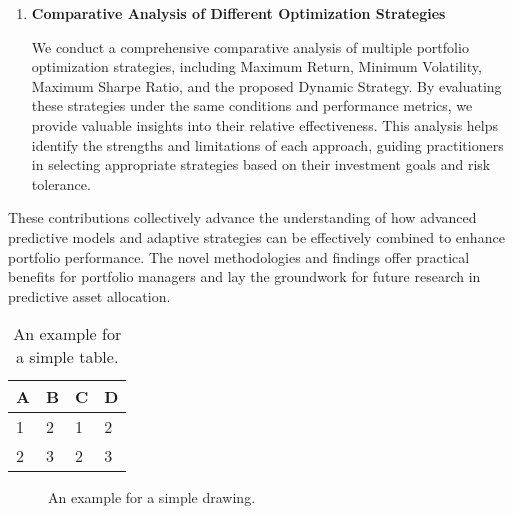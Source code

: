 \begin{enumerate}
    \item \textbf{Comparative Analysis of Different Optimization Strategies}

    We conduct a comprehensive comparative analysis of multiple portfolio optimization strategies, including Maximum Return, Minimum Volatility, Maximum Sharpe Ratio, and the proposed Dynamic Strategy. By evaluating these strategies under the same conditions and performance metrics, we provide valuable insights into their relative effectiveness. This analysis helps identify the strengths and limitations of each approach, guiding practitioners in selecting appropriate strategies based on their investment goals and risk tolerance.

\end{enumerate}

These contributions collectively advance the understanding of how advanced predictive models and adaptive strategies can be effectively combined to enhance portfolio performance. The novel methodologies and findings offer practical benefits for portfolio managers and lay the groundwork for future research in predictive asset allocation.




\begin{table}[htpb]
  \caption[Example table]{An example for a simple table.}
  \centering
  \begin{tabular}{l l l l}
    \toprule
      A & B & C & D \\
    \midrule
      1 & 2 & 1 & 2 \\
      2 & 3 & 2 & 3 \\
    \bottomrule
  \end{tabular}
\end{table}

\begin{figure}[htpb]
  \centering
  \caption[Example drawing]{An example for a simple drawing.}
\end{figure}

